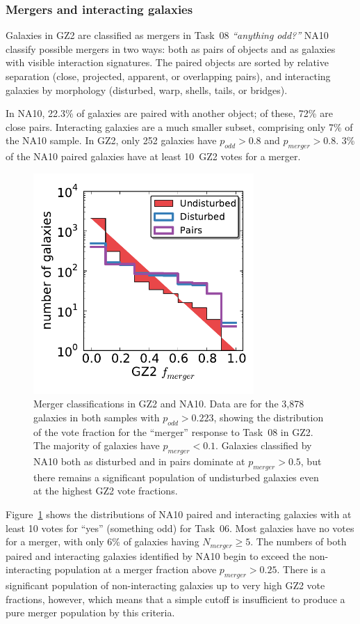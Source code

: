 \documentclass[useAMS,usenatbib]{mn2e}
\begin{document}
\subsubsection{Mergers and interacting galaxies}

Galaxies in GZ2 are classified as mergers in Task~08 {\it ``anything odd?''} NA10 classify possible mergers in two ways: both as pairs of objects and as galaxies with visible interaction signatures. The paired objects are sorted by relative separation (close, projected, apparent, or overlapping pairs), and interacting galaxies by morphology (disturbed, warp, shells, tails, or bridges). 

In NA10, 22.3\% of galaxies are paired with another object; of these, 72\% are close pairs. Interacting galaxies are a much smaller subset, comprising only 7\% of the NA10 sample. In GZ2, only 252 galaxies have $p_{odd}>0.8$ and $p_{merger}>0.8$. 3\% of the NA10 paired galaxies have at least 10~GZ2 votes for a merger. 

\begin{figure}
\includegraphics[angle=0,width=3.3in]{figures/na_gz2_mergers.pdf}
\caption{Merger classifications in GZ2 and NA10. Data are for the 3,878 galaxies in both samples with $p_{odd}>0.223$, showing the distribution of the vote fraction for the ``merger'' response to Task~08 in GZ2. The majority of galaxies have $p_{merger}<0.1$. Galaxies classified by NA10 both as disturbed and in pairs dominate at $p_{merger}>0.5$, but there remains a significant population of undisturbed galaxies even at the highest GZ2 vote fractions.
\label{fig-na_pairs}}
\end{figure}

Figure~\ref{fig-na_pairs} shows the distributions of NA10 paired and interacting galaxies with at least 10 votes for ``yes'' (something odd) for Task~06. Most galaxies have no votes for a merger, with only 6\% of galaxies having $N_{merger}\ge5$. The numbers of both paired and interacting galaxies identified by NA10 begin to exceed the non-interacting population at a merger fraction above $p_{merger}>0.25$. There is a significant population of non-interacting galaxies up to very high GZ2 vote fractions, however, which means that a simple cutoff is insufficient to produce a pure merger population by this criteria. 
\end{document}
